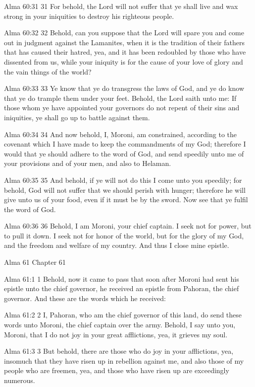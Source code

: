 Alma 60:31
 31 For behold, the Lord will not suffer that ye shall live and
wax strong in your iniquities to destroy his righteous people.

Alma 60:32
 32 Behold, can you suppose that the Lord will spare you and come
out in judgment against the Lamanites, when it is the tradition
of their fathers that has caused their hatred, yea, and it has
been redoubled by those who have dissented from us, while your
iniquity is for the cause of your love of glory and the vain
things of the world?

Alma 60:33
 33 Ye know that ye do transgress the laws of God, and ye do know
that ye do trample them under your feet. Behold, the Lord saith
unto me: If those whom ye have appointed your governors do not
repent of their sins and iniquities, ye shall go up to battle
against them.

Alma 60:34
 34 And now behold, I, Moroni, am constrained, according to the
covenant which I have made to keep the commandments of my God;
therefore I would that ye should adhere to the word of God, and
send speedily unto me of your provisions and of your men, and
also to Helaman.

Alma 60:35
 35 And behold, if ye will not do this I come unto you speedily;
for behold, God will not suffer that we should perish with
hunger; therefore he will give unto us of your food, even if it
must be by the sword. Now see that ye fulfil the word of God.

Alma 60:36
 36 Behold, I am Moroni, your chief captain. I seek not for
power, but to pull it down. I seek not for honor of the world,
but for the glory of my God, and the freedom and welfare of my
country. And thus I close mine epistle.

Alma 61
Chapter 61

Alma 61:1
 1 Behold, now it came to pass that soon after Moroni had sent
his epistle unto the chief governor, he received an epistle from
Pahoran, the chief governor. And these are the words which he
received:

Alma 61:2
 2 I, Pahoran, who am the chief governor of this land, do send
these words unto Moroni, the chief captain over the army.
Behold, I say unto you, Moroni, that I do not joy in your great
afflictions, yea, it grieves my soul.

Alma 61:3
 3 But behold, there are those who do joy in your afflictions,
yea, insomuch that they have risen up in rebellion against me,
and also those of my people who are freemen, yea, and those who
have risen up are exceedingly numerous.

